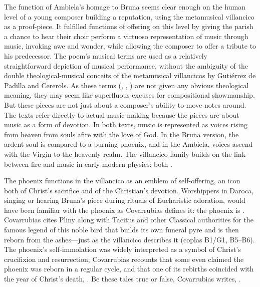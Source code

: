 The function of Ambiela's homage to Bruna seems clear enough on the human level
of a young composer building a reputation, using the metamusical villancico as
a proof-piece.
It fulfilled functions of offering on this level by giving the parish a chance
to hear their choir perform a virtuoso representation of music through music,
invoking awe and wonder, while allowing the composer to offer a tribute to his
predecessor.
The poem's musical terms are used as a relatively straightforward depiction of
musical performance, without the ambiguity of the double theological-musical
conceits of the metamusical villancicos by Gutiérrez de Padilla and Cererols.
As these terms (, , ) are
not given any obvious theological meaning, they may seem like superfluous
excuses for compositional showmanship.
But these pieces are not just about a composer's ability to move notes around.
The texts refer directly to actual music-making because the pieces are about
music as a form of devotion.
In both texts, music is represented as voices rising from heaven from souls
afire with the love of God.
In the Bruna version, the ardent soul is compared to a burning phoenix, and in
the Ambiela, voices ascend with the Virgin to the heavenly realm.
The villancico family builds on the link between fire and music in early modern
physics: both .

The phoenix functions in the villancico as an emblem of self-offering, an icon
both of Christ's sacrifice and of the Christian's devotion.
Worshippers in Daroca, singing or hearing Bruna's piece during rituals of
Eucharistic adoration, would have been familiar with the phoenix as Covarrubias
defines it: the phoenix is .%
    \Autocite[400, ]{Covarrubias:Tesoro}
Covarrubias cites Pliny along with Tacitus and other Classical authorities for
the famous legend of this noble bird that builds its own funeral pyre and is
then reborn from the ashes---just as the villancico describes it (coplas B1/G1,
B5--B6).
The phoenix's self-immolation was widely interpreted as a symbol of Christ's
crucifixion and resurrection; Covarrubias recounts that some even claimed the
phoenix was reborn in a regular cycle, and that one of its rebirths coincided
with the year of Christ's death, .
Be these tales true or false, Covarrubias writes, .%
    \Autocite[400, ]{Covarrubias:Tesoro}


